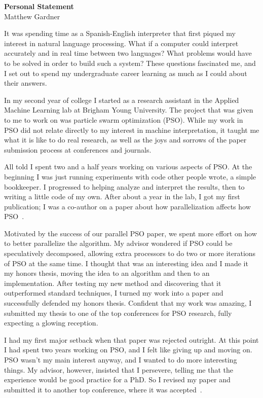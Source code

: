 \documentclass[onecolumn, 12pt]{article}
\title{}
\author{}
\date{}
\begin{document}
\pagestyle{empty}

\begin{center}
  \textbf{Personal Statement}\\
  Matthew Gardner
\end{center}

It was spending time as a Spanish-English interpreter that first piqued my
interest in natural language processing.  What if a computer could interpret
accurately and in real time between two languages?  What problems would have to
be solved in order to build such a system?  These questions fascinated me, and
I set out to spend my undergraduate career learning as much as I could about
their answers.

In my second year of college I started as a research assistant in the Applied
Machine Learning lab at Brigham Young University.  The project that was given
to me to work on was particle swarm optimization (PSO).  While my work in PSO
did not relate directly to my interest in machine interpretation, it taught me
what it is like to do real research, as well as the joys and sorrows of the
paper submission process at conferences and journals.

All told I spent two and a half years working on various aspects of PSO.  At
the beginning I was just running experiments with code other people wrote, a
simple bookkeeper.  I progressed to helping analyze and interpret the results,
then to writing a little code of my own.  After about a year in the lab, I got
my first publication; I was a co-author on a paper about how parallelization
affects how PSO~\cite{mcnabb-2009-large-particle-swarms}.  

Motivated by the success of our parallel PSO paper, we spent more effort on how
to better parallelize the algorithm.  My advisor wondered if PSO could be
speculatively decomposed, allowing extra processors to do two or more
iterations of PSO at the same time.  I thought that was an interesting idea and
I made it my honors thesis, moving the idea to an algorithm and then to an
implementation.  After testing my new method and discovering that it
outperformed standard techniques, I turned my work into a paper and
successfully defended my honors thesis.  Confident that my work was amazing, I
submitted my thesis to one of the top conferences for PSO research, fully
expecting a glowing reception.

I had my first major setback when that paper was rejected outright.  At this
point I had spent two years working on PSO, and I felt like giving up and
moving on.  PSO wasn't my main interest anyway, and I wanted to do more
interesting things.  My advisor, however, insisted that I persevere, telling
me that the experience would be good practice for a PhD.  So I revised my paper
and submitted it to another top conference, where it was
accepted~\cite{gardner-2010-speculative-evaluation-in-pso}.
\end{document}
